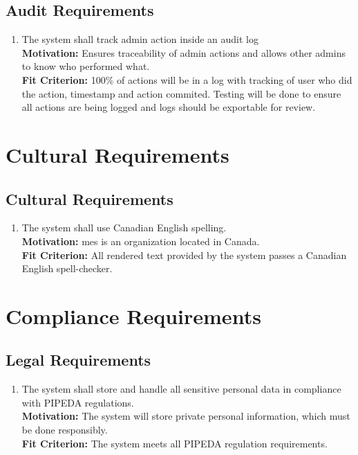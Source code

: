 \documentclass[12pt]{article}
\begin{document}
\subsection{Audit Requirements}
\begin{enumerate}[align=left,
  leftmargin=*,
  labelsep=1em,
  itemindent=0em,
  label=\bfseries AU-\arabic*:]
  \item The system shall track admin action inside an audit log\\[2mm]
    {\bf Motivation:} Ensures traceability of admin actions and allows other admins to know who performed what.  \\
    {\bf Fit Criterion:} 100\% of actions will be in a log with tracking of user who did the action, timestamp and action commited. Testing will be done to ensure all actions are being logged and logs should be exportable for review.
\end{enumerate}

\section{Cultural Requirements}
\subsection{Cultural Requirements}
\begin{enumerate}[align=left,
  leftmargin=*,
  labelsep=1em,
  itemindent=0em,
  label=\bfseries CL-\arabic*:]
  \item The system shall use Canadian English spelling.\\[2mm]
    {\bf Motivation:} \Gls{mes} is an organization located in Canada.\\
    {\bf Fit Criterion:} All rendered text provided by the system passes a Canadian English spell-checker.\\
\end{enumerate}

\section{Compliance Requirements}
\subsection{Legal Requirements}
\begin{enumerate}[align=left,
  leftmargin=*,
  labelsep=1em,
  itemindent=0em,
  label=\bfseries LG-\arabic*:]
  \item The system shall store and handle all sensitive personal data in compliance with PIPEDA regulations.\\[2mm]
    {\bf Motivation:} The system will store private personal information, which must be done responsibly.\\
    {\bf Fit Criterion:} The system meets all PIPEDA regulation requirements.\\
\end{enumerate}
\end{document}
